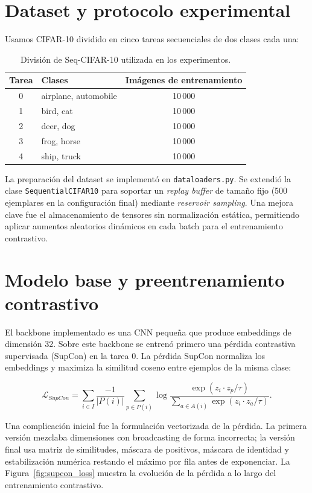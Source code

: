 \documentclass[10pt,a4paper]{article}
\begin{document}
\section{Dataset y protocolo experimental}

Usamos CIFAR-10 dividido en cinco tareas secuenciales de dos clases cada una:

\begin{table}[H]
\centering
\caption{División de Seq-CIFAR-10 utilizada en los experimentos.}
\begin{tabular}{clc}
\toprule
Tarea & Clases & Imágenes de entrenamiento \\
\midrule
0 & airplane, automobile & 10\,000 \\
1 & bird, cat & 10\,000 \\
2 & deer, dog & 10\,000 \\
3 & frog, horse & 10\,000 \\
4 & ship, truck & 10\,000 \\
\bottomrule
\end{tabular}
\end{table}

La preparación del dataset se implementó en \texttt{dataloaders.py}. Se extendió la clase \texttt{SequentialCIFAR10} para soportar un \textit{replay buffer} de tamaño fijo (500 ejemplares en la configuración final) mediante \textit{reservoir sampling}. Una mejora clave fue el almacenamiento de tensores sin normalización estática, permitiendo aplicar aumentos aleatorios dinámicos en cada batch para el entrenamiento contrastivo.

\section{Modelo base y preentrenamiento contrastivo}

El backbone implementado es una CNN pequeña que produce embeddings de dimensión 32. Sobre este backbone se entrenó primero una pérdida contrastiva supervisada (SupCon) en la tarea 0. La pérdida SupCon normaliza los embeddings y maximiza la similitud coseno entre ejemplos de la misma clase:

\begin{equation}
\mathcal{L}_{SupCon} =
\sum_{i \in I}
\frac{-1}{|P(i)|}
\sum_{p \in P(i)}
\log
\frac{\exp(z_i \cdot z_p / \tau)}
{\sum_{a \in A(i)} \exp(z_i \cdot z_a / \tau)}.
\end{equation}

Una complicación inicial fue la formulación vectorizada de la pérdida. La primera versión mezclaba dimensiones con broadcasting de forma incorrecta; la versión final usa matriz de similitudes, máscara de positivos, máscara de identidad y estabilización numérica restando el máximo por fila antes de exponenciar. La Figura~\ref{fig:supcon_loss} muestra la evolución de la pérdida a lo largo del entrenamiento contrastivo.
\end{document}
